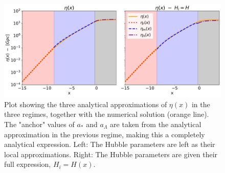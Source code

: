 \documentclass[10pt, a4paper]{article}
\begin{document}
\begin{figure}[H]
    \centering
    \includegraphics[scale=0.5]{../m1_figs/Eta2.pdf}
    \caption{Plot showing the three analytical approximations of $\eta(x)$ in the three regimes, together with the numerical solution (orange line). The "anchor" values of $a_*$ and $a_\Lambda$ are taken from the analytical approximation in the previous regime, making this a completely analytical expression. Left: The Hubble parameters are left as their local approximations. Right: The Hubble parameters are given their full expression, $H_i = H(x)$.}
    \label{fig:Eta2}
\end{figure}




\end{document}
